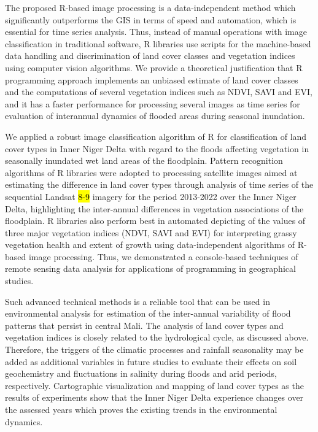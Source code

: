 \documentclass[12pt,a4paper,oneside]{article}
\def \newpar{\vspace{6pt}}
\begin{document}
\newpar The proposed R-based image processing is a data-independent method which significantly outperforms the GIS in terms of speed and automation, which is essential for time series analysis. Thus, instead of manual operations with image classification in traditional software, R libraries use scripts for the machine-based data handling and discrimination of land cover classes and vegetation indices using computer vision algorithms. We provide a theoretical justification that R programming approach implements an unbiased estimate of land cover classes and the computations of several vegetation indices such as NDVI, SAVI and EVI, and it has a faster performance for processing several images as time series for evaluation of interannual dynamics of flooded areas during seasonal inundation. 

\newpar We applied a robust image classification algorithm of R for classification of land cover types in Inner Niger Delta with regard to the floods affecting vegetation in seasonally inundated wet land areas of the floodplain. Pattern recognition algorithms of R libraries were adopted to processing satellite images aimed at estimating the difference in land cover types through analysis of time series of the sequential Landsat \hl{8-9} imagery for the period 2013-2022 over the Inner Niger Delta, highlighting the inter-annual differences in vegetation associations of the floodplain. R libraries also perform best in automated depicting of the values of three major vegetation indices (NDVI, SAVI and EVI) for interpreting grassy vegetation health and extent of growth using data-independent algorithms of R-based image processing. Thus, we demonstrated a console-based techniques of remote sensing data analysis for applications of programming in geographical studies. 

\newpar Such advanced technical methods is a reliable tool that can be used in environmental analysis for estimation of the inter-annual variability of flood patterns that persist in central Mali. The analysis of land cover types and vegetation indices is closely related to the hydrological cycle, as discussed above. Therefore, the triggers of the climatic processes and rainfall seasonality may be added as additional variables in future studies to evaluate their effects on soil geochemistry and fluctuations in salinity during floods and arid periods, respectively. Cartographic visualization and mapping of land cover types as the results of experiments show that the Inner Niger Delta experience changes over the assessed years which proves the existing trends in the environmental dynamics.  
\end{document}
